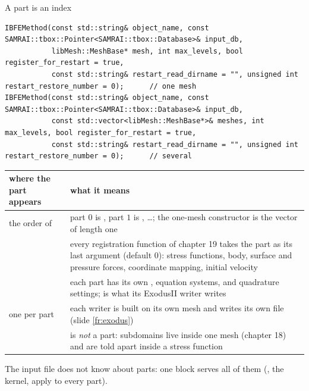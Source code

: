 \documentclass[aspectratio=169,11pt]{beamer}
\begin{document}
\begin{frame}[fragile]{A part is an index}
\label{fr:part}
\scriptsize
\begin{lstlisting}[style=cpptiny]
IBFEMethod(const std::string& object_name, const SAMRAI::tbox::Pointer<SAMRAI::tbox::Database>& input_db,
           libMesh::MeshBase* mesh, int max_levels, bool register_for_restart = true,
           const std::string& restart_read_dirname = "", unsigned int restart_restore_number = 0);      // one mesh
IBFEMethod(const std::string& object_name, const SAMRAI::tbox::Pointer<SAMRAI::tbox::Database>& input_db,
           const std::vector<libMesh::MeshBase*>& meshes, int max_levels, bool register_for_restart = true,
           const std::string& restart_read_dirname = "", unsigned int restart_restore_number = 0);      // several
\end{lstlisting}
\begin{tabular}{@{}L{0.34\textwidth}L{0.58\textwidth}@{}}
\toprule
where the part appears & what it means \\
\midrule
the order of  & part $0$ is , part $1$ is , \ldots; the one-mesh constructor is the vector of length one \\
 & every registration function of chapter 19 takes the part as its last argument (default $0$): stress functions, body, surface and pressure forces, coordinate mapping, initial velocity \\
 & each part has its own , equation systems, and quadrature settings;  is what its ExodusII writer writes \\
one  per part & each writer is built on its own mesh and writes its own file (slide \ref{fr:exodus}) \\
 & is \emph{not} a part: subdomains live inside one mesh (chapter 18) and are told apart inside a stress function \\
\bottomrule
\end{tabular}

\medskip
The input file does not know about parts: one  block serves all of them (, the kernel,  apply to every part).
\end{frame}
\end{document}
